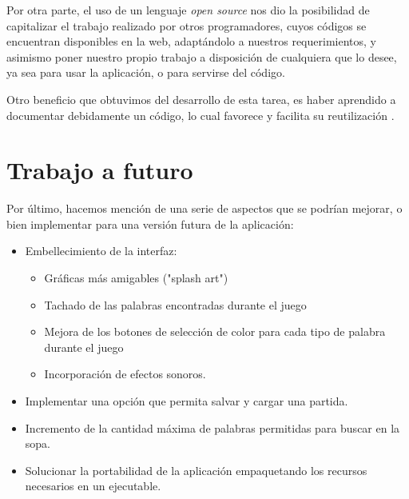 Por otra parte, el uso de un lenguaje \emph{open source} nos dio la posibilidad de capitalizar el trabajo realizado por otros programadores, cuyos códigos se encuentran disponibles en la web, adaptándolo a nuestros requerimientos, y asimismo poner nuestro propio trabajo a disposición de cualquiera que lo desee, ya sea para usar la aplicación, o para servirse del código.

Otro beneficio que obtuvimos del desarrollo de esta tarea, es haber aprendido a documentar debidamente un código, lo cual favorece y facilita su reutilización .

\section{Trabajo a futuro}
Por último, hacemos mención de una serie de aspectos que se podrían mejorar, o bien implementar para una versión futura de la aplicación:
\begin{itemize}
\item Embellecimiento de la interfaz: 
\begin{itemize} 
	\item Gráficas más amigables ("splash art")
	\item Tachado de las palabras encontradas durante el juego
	\item Mejora de los botones de selección de color para cada tipo de palabra durante el juego
	\item Incorporación de efectos sonoros.
\end{itemize}
\item  Implementar una opción que permita salvar y cargar una partida.
\item  Incremento de la cantidad máxima de palabras permitidas para buscar en la sopa.
\item  Solucionar la portabilidad de la aplicación empaquetando los recursos necesarios en un ejecutable.
\end{itemize}